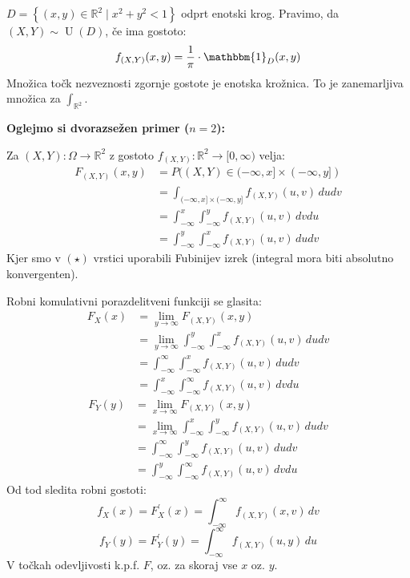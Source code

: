 \documentclass[12pt]{book}
\def\n{\noindent}
\theoremstyle{definition}
\theoremstyle{plain}
\theoremstyle{plain}
\theoremstyle{plain}
\theoremstyle{remark}
\begin{document}
\begin{zgled}
    $D = \left\{(x, y) \in \mathbb{R}^2 \mid x^2+y^2<1\right\}$ odprt enotski krog. Pravimo, da $(X, Y) \sim \operatorname{U}(D)$, če ima gostoto: 
    $$
    f_{(X, Y)}(x, y)=\frac{1}{\pi} \cdot \mathbbm{1}_D(x, y)
    $$
    Množica točk nezveznosti zgornje gostote je enotska krožnica. To je zanemarljiva množica za $\int_{\mathbb{R}^2}$.
\end{zgled}

\n \textbf{Oglejmo si dvorazsežen primer ($n=2$):}

\n Za $(X, Y): \Omega \to \mathbb{R}^2$ z gostoto $f_{(X, Y)}: \mathbb{R}^2 \to [0, \infty)$ velja: 
\begin{align*}
    F_{(X, Y)}(x, y)&=P((X, Y) \in(-\infty, x] \times(-\infty, y]) \\
    &=\int_{(-\infty, x] \times(-\infty, y]} f_{(X, Y)}(u, v) \, d u d v \\
    &=\int_{-\infty}^x \int_{-\infty}^y f_{(X, Y)}(u, v) \, d v d u \tag{$\star$} \\
    &=\int_{-\infty}^y \int_{-\infty}^x f_{(X, Y)}(u, v) \, d u d v
\end{align*}
Kjer smo v $(\star)$ vrstici uporabili Fubinijev izrek (integral mora biti absolutno konvergenten).

\n Robni komulativni porazdelitveni funkciji se glasita: 
$$
\begin{aligned}
    F_X(x)&=\lim _{y \rightarrow \infty} F_{(X, Y)}(x, y) \\
    &=\lim _{y \rightarrow \infty} \int_{-\infty}^y \int_{-\infty}^x f_{(X, Y)}(u, v) \, d u d v \\
    &=\int_{-\infty}^{\infty} \int_{-\infty}^x f_{(X, Y)}(u, v) \,d u d v \\
    &=\int_{-\infty}^x \int_{-\infty}^{\infty} f_{(X, Y)}(u, v) \, d v d u
\end{aligned}
$$
$$
\begin{aligned}
    F_Y(y)&=\lim _{x \rightarrow \infty} F_{(X, Y)}(x, y) \\
    &=\lim _{x \rightarrow \infty} \int_{-\infty}^x \int_{-\infty}^y f_{(X, Y)}(u, v) \, d u d v \\
    &=\int_{-\infty}^{\infty} \int_{-\infty}^y f_{(X, Y)}(u, v) \,d u d v \\
    &=\int_{-\infty}^y \int_{-\infty}^{\infty} f_{(X, Y)}(u, v) \, d v d u
\end{aligned}
$$
Od tod sledita robni gostoti: 
$$
f_X(x)=F_X^{\prime}(x)=\int_{-\infty}^{\infty} f_{(X, Y)}(x, v) \, d v
$$
$$
f_Y(y)=F_Y^{\prime}(y)=\int_{-\infty}^{\infty} f_{(X, Y)}(u, y) \, d u
$$
V točkah odevljivosti k.p.f. $F$, oz. za skoraj vse $x$ oz. $y$. 
\end{document}
